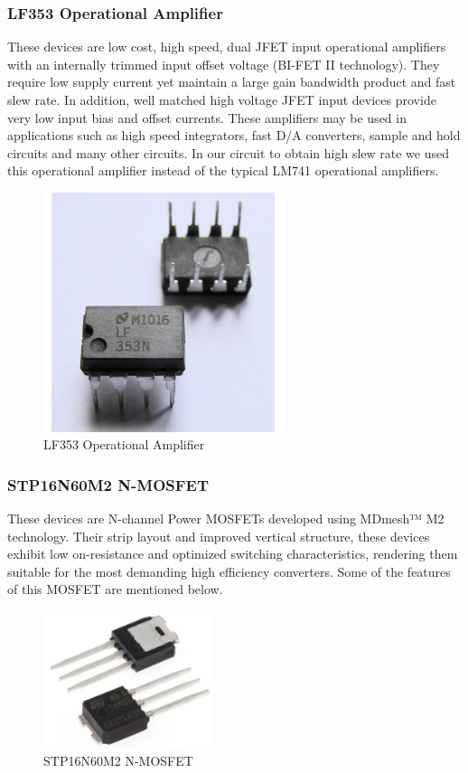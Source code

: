 \documentclass[a4paper,12pt]{article}
\begin{document}
\begin{multicols}{2}
\subsubsection{LF353 Operational Amplifier}
These devices are low cost, high speed, dual JFET input operational amplifiers with an internally trimmed input offset voltage (BI-FET II technology). They require low supply current yet maintain a large gain bandwidth product and fast slew rate. \columnbreak In addition, well matched high voltage JFET input devices provide very low input bias and offset currents. These amplifiers may be used in applications such as
high speed integrators, fast D/A converters, sample and hold circuits and many other circuits. In our circuit to obtain high slew rate we used this operational amplifier instead of the typical LM741 operational amplifiers. 
\begin{figure}[H]
    \centering
    \includegraphics[width=7cm]{lf353.jpg}
    \caption{LF353 Operational Amplifier}
    \label{fig:LF353}
\end{figure}
\subsubsection{STP16N60M2 N-MOSFET}
These devices are N-channel Power MOSFETs developed using MDmesh™ M2 technology. Their strip layout and improved vertical structure, these devices exhibit low on-resistance and optimized switching characteristics, rendering them suitable for the most demanding high efficiency converters. Some of the features of this MOSFET are mentioned below.
\begin{figure}[H]
    \centering
    \includegraphics[width=5cm,height=4cm]{Mosfet.jpg}
    \caption{STP16N60M2 N-MOSFET}
    \label{fig:STP16N60M2 N-MOSFET}
\end{figure}
\end{multicols}
\end{document}
